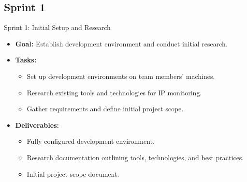 \documentclass[11pt,a4paper]{article}
\begin{document}
    \subsection{Sprint 1}\label{subsec:sprint-1}
    \begin{frame}{Sprint 1: Initial Setup and Research}
        \begin{itemize}
            \item \textbf{Goal:} Establish development environment and conduct initial research.
            \item \textbf{Tasks:}
            \begin{itemize}
                \item Set up development environments on team members' machines.
                \item Research existing tools and technologies for IP monitoring.
                \item Gather requirements and define initial project scope.
            \end{itemize}
            \item \textbf{Deliverables:}
            \begin{itemize}
                \item Fully configured development environment.
                \item Research documentation outlining tools, technologies, and best practices.
                \item Initial project scope document.
            \end{itemize}
        \end{itemize}
    \end{frame}
\end{document}
